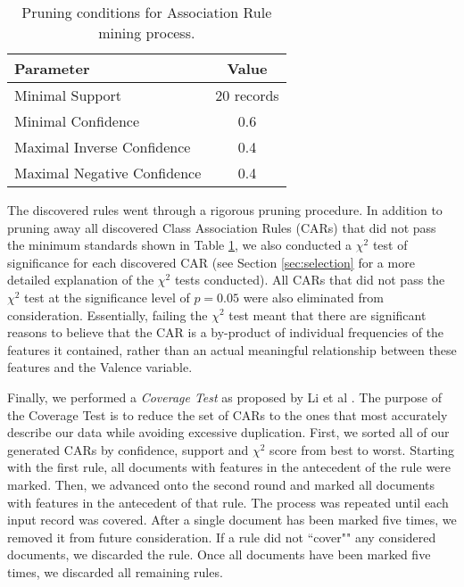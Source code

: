 \begin{table}
    \centering
    \begin{tabular}{|l|c|}
    \hline
    \textsf{Parameter} & \textsf{Value} \\
    \hline
    Minimal Support  &  20 records\\ 
    Minimal Confidence & 0.6 \\
    Maximal Inverse Confidence & 0.4\\
    Maximal Negative Confidence& 0.4\\
    \hline
    \end{tabular}
    \caption{Pruning conditions for Association Rule mining process.}
    \label{tab:AR}
\end{table} 
 

 
 
  The discovered rules went through a rigorous pruning procedure. In addition
  to pruning away all discovered Class Association Rules (CARs) that did not
  pass the minimum standards shown in Table \ref{tab:AR}, we also conducted
  a $\chi^2$ test of significance for each discovered CAR (see Section \ref{sec:selection}
  for a more detailed explanation of the $\chi^2$ tests conducted). All CARs
  that did not pass the $\chi^2$ test at the significance level of
  $p=0.05$ were also eliminated from consideration. Essentially, failing
  the $\chi^2$ test meant that there are significant reasons to believe that 
  the CAR is a by-product of individual frequencies of the features it contained,
  rather than an actual meaningful relationship between these features and
  the \textsf{Valence} variable.
  
 Finally, we performed a \textit{Coverage Test} as proposed by Li et al \cite{cmar}. The purpose of the \textsf{Coverage Test} is to reduce the set of CARs to the ones that most accurately describe our data while avoiding excessive duplication. First, we sorted all of our generated CARs by confidence, support and $\chi^2$ score from best to worst. Starting with the first rule, all documents with features in the antecedent of the rule were marked. Then, we advanced onto the second round and marked all documents with features in the antecedent of that rule. The process was repeated until each input record was covered. After a single document has been marked five times, we removed it from future consideration. If a rule did not ``cover"" any considered documents, we discarded the rule. Once all documents have been marked five times, we discarded all remaining rules.
 
